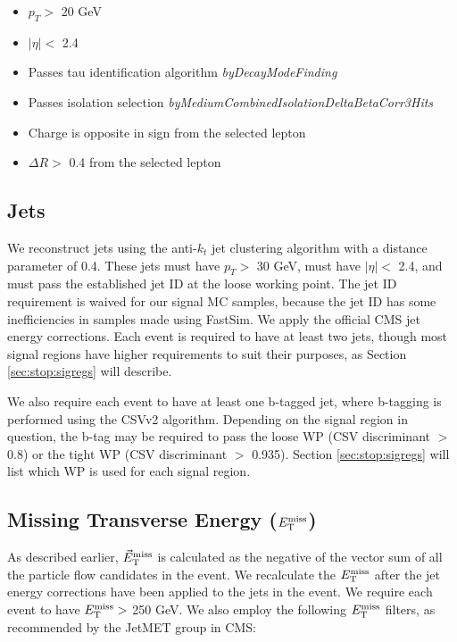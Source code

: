 \begin{itemize}
\item $p_T >$ 20 GeV
\item $|\eta| <$ 2.4
\item Passes tau identification algorithm \emph{byDecayModeFinding}
\item Passes isolation selection
  \emph{byMediumCombinedIsolationDeltaBetaCorr3Hits}
\item Charge is opposite in sign from the selected lepton
\item $\Delta R >$ 0.4 from the selected lepton
\end{itemize}

\subsection{Jets}
\label{ssec:stop:jets}

We reconstruct jets using the anti-$k_t$ jet clustering algorithm
\cite{antikt} with a distance parameter of 0.4. These jets must have
$p_T >$ 30 GeV, must have $|\eta| <$ 2.4, and must pass the
established jet ID at the loose working point. The jet ID requirement
is waived for our signal MC samples, because the jet ID has some
inefficiencies in samples made using FastSim. We apply the official
CMS jet energy corrections. Each event is required to have at least
two jets, though most signal regions have higher requirements to
suit their purposes, as Section \ref{sec:stop:sigregs} will describe.

We also require each event to have at least one b-tagged jet, where
b-tagging is performed using the CSVv2 algorithm. Depending on the
signal region in question, the b-tag may be required to pass the loose
WP (CSV discriminant $>$ 0.8) or the tight WP (CSV discriminant $>$ 0.935). Section
\ref{sec:stop:sigregs} will list which WP is used for each signal region.

\subsection{Missing Transverse Energy (\texorpdfstring{$E_\text{T}^\text{miss}$}{MET})}
\label{ssec:stop:met}

As described earlier, $\vec{E}_\text{T}^\text{miss}$ is calculated as the negative of the vector
sum of all the particle flow candidates in the event. We recalculate
the $E_\text{T}^\text{miss}$ after the jet energy corrections have been applied to the jets
in the event. We require each event to have $E_\text{T}^\text{miss} >$ 250 GeV. We also
employ the following $E_\text{T}^\text{miss}$ filters, as recommended by the JetMET group in CMS:

